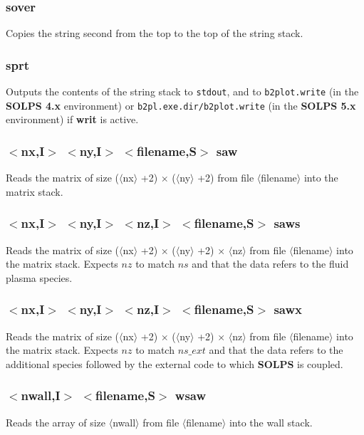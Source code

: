 \documentclass[a4paper,10pt]{report}
\newcommand\SOLPSfour{{\bf SOLPS 4.x} }
\newcommand\SOLPSfive{{\bf SOLPS 5.x} }
\begin{document}
\subsubsection{sover}\label{sec:sover}
Copies the string second from the top to the top of the string stack.

\subsubsection{sprt}\label{sec:sprt}
Outputs the contents of the string stack to \verb:stdout:, and to \verb:b2plot.write:
(in the \SOLPSfour environment) or \verb:b2pl.exe.dir/b2plot.write:
(in the \SOLPSfive environment) if {\bf writ} is active.

\subsubsection{$<$nx,{\bf I}$>$ $<$ny,{\bf I}$>$ $<$filename,{\bf S}$>$ saw}\label{sec:saw}
Reads the matrix of size ($\langle$nx$\rangle$ +2) $\times$ ($\langle$ny$\rangle$ +2) from file $\langle$filename$\rangle$ into the matrix stack.

\subsubsection{$<$nx,{\bf I}$>$ $<$ny,{\bf I}$>$ $<$nz,{\bf I}$>$ $<$filename,{\bf S}$>$ saws}\label{sec:saws}
Reads the matrix of size ($\langle$nx$\rangle$ +2) $\times$ ($\langle$ny$\rangle$ +2) $\times$ $\langle$nz$\rangle$ from file $\langle$filename$\rangle$ into the
matrix stack. Expects $nz$ to match $ns$ and that the data refers to the fluid plasma species.

\subsubsection{$<$nx,{\bf I}$>$ $<$ny,{\bf I}$>$ $<$nz,{\bf I}$>$ $<$filename,{\bf S}$>$ sawx}\label{sec:sawx}
Reads the matrix of size ($\langle$nx$\rangle$ +2) $\times$ ($\langle$ny$\rangle$ +2) $\times$ $\langle$nz$\rangle$ from file $\langle$filename$\rangle$ into the
matrix stack. Expects $nz$ to match $ns\_ext$ and that the data refers to the additional species followed by the external code to which {\bf SOLPS} is coupled.

\subsubsection{$<$nwall,{\bf I}$>$ $<$filename,{\bf S}$>$ wsaw}\label{sec:wsaw}
Reads the array of size $\langle$nwall$\rangle$ from file $\langle$filename$\rangle$ into the wall stack.
\end{document}
